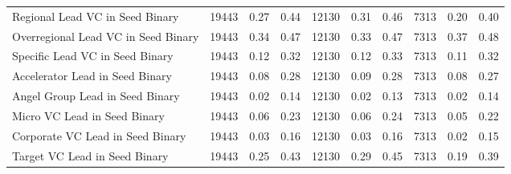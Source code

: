 {\begin{table}[!h]
{\begin{tabular}[t]{lrrrrrrrrr}
Regional Lead VC in Seed Binary & 19443 & 0.27 & 0.44 & 12130 & 0.31 & 0.46 & 7313 & 0.20 & 0.40\\
Overregional Lead VC in Seed Binary & 19443 & 0.34 & 0.47 & 12130 & 0.33 & 0.47 & 7313 & 0.37 & 0.48\\
Specific Lead VC in Seed Binary & 19443 & 0.12 & 0.32 & 12130 & 0.12 & 0.33 & 7313 & 0.11 & 0.32\\
Accelerator Lead in Seed Binary & 19443 & 0.08 & 0.28 & 12130 & 0.09 & 0.28 & 7313 & 0.08 & 0.27\\
\addlinespace
Angel Group Lead in Seed Binary & 19443 & 0.02 & 0.14 & 12130 & 0.02 & 0.13 & 7313 & 0.02 & 0.14\\
Micro VC Lead in Seed Binary & 19443 & 0.06 & 0.23 & 12130 & 0.06 & 0.24 & 7313 & 0.05 & 0.22\\
Corporate VC Lead in Seed Binary & 19443 & 0.03 & 0.16 & 12130 & 0.03 & 0.16 & 7313 & 0.02 & 0.15\\
Target VC Lead in Seed Binary & 19443 & 0.25 & 0.43 & 12130 & 0.29 & 0.45 & 7313 & 0.19 & 0.39\\
\bottomrule
\end{tabular}}
\end{table}
}
